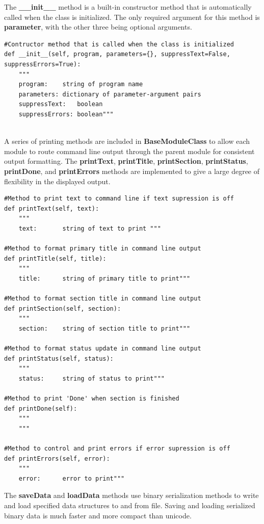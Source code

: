 The \textbf{\_\_init\_\_} method is a built-in constructor method that is automatically called when the class is initialized. The only required argument for this method is \textbf{parameter}, with the other three being optional arguments. \\

\begin{lstlisting}[frame=single]
#Contructor method that is called when the class is initialized
def __init__(self, program, parameters={}, suppressText=False, suppressErrors=True):
	"""
	program:	string of program name
	parameters:	dictionary of parameter-argument pairs
	suppressText:	boolean
	suppressErrors:	boolean"""
	
\end{lstlisting}

A series of printing methods are included in \textbf{BaseModuleClass} to allow each module to route command line output through the parent module for consistent output formatting. The \textbf{printText}, \textbf{printTitle}, \textbf{printSection}, \textbf{printStatus}, \textbf{printDone}, and \textbf{printErrors} methods are implemented to give a large degree of flexibility in the displayed output.

\begin{lstlisting}[frame=single]
#Method to print text to command line if text supression is off
def printText(self, text):
	"""
	text:		string of text to print """
	
#Method to format primary title in command line output 
def printTitle(self, title):
	"""
	title:		string of primary title to print"""
	
#Method to format section title in command line output 
def printSection(self, section):
	"""
	section:	string of section title to print"""
	
#Method to format status update in command line output 
def printStatus(self, status):
	"""
	status:		string of status to print"""
	
#Method to print 'Done' when section is finished 
def printDone(self):
	"""	
	"""
	
#Method to control and print errors if error supression is off
def printErrors(self, error):
	"""
	error:		error to print"""
\end{lstlisting}

The \textbf{saveData} and \textbf{loadData} methods use binary serialization methods to write and load specified data structures to and from file. Saving and loading serialized binary data is much faster and more compact than unicode.

